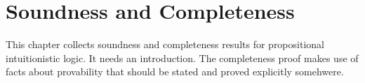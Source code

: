\documentclass[../../../include/open-logic-chapter]{subfiles}
\begin{document}
\chapter{Soundness and Completeness}

\begin{editorial}
  This chapter collects soundness and completeness results for
  propositional intuitionistic logic. It needs an introduction. The
  completeness proof makes use of facts about provability that should
  be stated and proved explicitly somehwere.
\end{editorial}


\OLEndChapterHook
\end{document}
